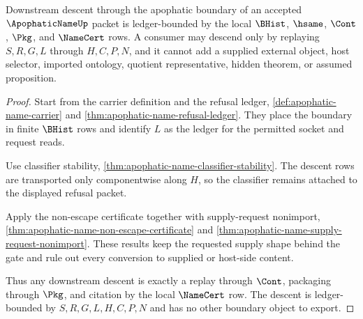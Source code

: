 \begin{theorem}
\label{thm:apophatic-name-boundary-descent-ledger}
Downstream descent through the apophatic boundary of an accepted $\ApophaticNameUp$ packet is ledger-bounded by the local $\BHist$, $\hsame$, $\Cont$, $\Pkg$, and $\NameCert$ rows. A consumer may descend only by replaying $S,R,G,L$ through $H,C,P,N$, and it cannot add a supplied external object, host selector, imported ontology, quotient representative, hidden theorem, or assumed proposition.
\end{theorem}
\begin{proof}
Start from the carrier definition and the refusal ledger, \autoref{def:apophatic-name-carrier} and \autoref{thm:apophatic-name-refusal-ledger}. They place the boundary in finite $\BHist$ rows and identify $L$ as the ledger for the permitted socket and request reads.

Use classifier stability, \autoref{thm:apophatic-name-classifier-stability}. The descent rows are transported only componentwise along $H$, so the classifier remains attached to the displayed refusal packet.

Apply the non-escape certificate together with supply-request nonimport, \autoref{thm:apophatic-name-non-escape-certificate} and \autoref{thm:apophatic-name-supply-request-nonimport}. These results keep the requested supply shape behind the gate and rule out every conversion to supplied or host-side content.

Thus any downstream descent is exactly a replay through $\Cont$, packaging through $\Pkg$, and citation by the local $\NameCert$ row. The descent is ledger-bounded by $S,R,G,L,H,C,P,N$ and has no other boundary object to export.
\end{proof}

